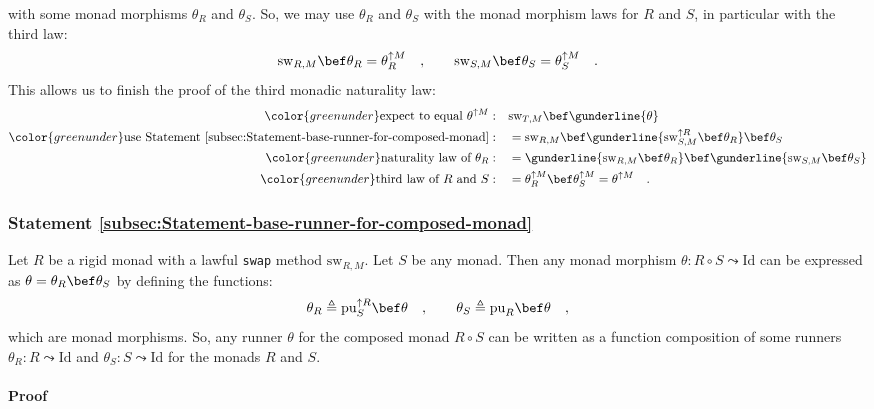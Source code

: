 with some monad morphisms $\theta_{R}$ and $\theta_{S}$. So, we
may use $\theta_{R}$ and $\theta_{S}$ with the monad morphism laws
for $R$ and $S$, in particular with the third law:
\[
\text{sw}_{R,M}\bef\theta_{R}=\theta_{R}^{\uparrow M}\quad,\quad\quad\text{sw}_{S,M}\bef\theta_{S}=\theta_{S}^{\uparrow M}\quad.
\]
This allows us to finish the proof of the third monadic naturality
law:
\begin{align*}
{\color{greenunder}\text{expect to equal }\theta^{\uparrow M}:}\quad & \text{sw}_{T,M}\bef\gunderline{\theta}\\
{\color{greenunder}\text{use Statement~\ref{subsec:Statement-base-runner-for-composed-monad}}:}\quad & =\text{sw}_{R,M}\bef\gunderline{\text{sw}_{S,M}^{\uparrow R}\bef\theta_{R}}\bef\theta_{S}\\
{\color{greenunder}\text{naturality law of }\theta_{R}:}\quad & =\gunderline{\text{sw}_{R,M}\bef\theta_{R}}\bef\gunderline{\text{sw}_{S,M}\bef\theta_{S}}\\
{\color{greenunder}\text{third law of }R\text{ and }S:}\quad & =\theta_{R}^{\uparrow M}\bef\theta_{S}^{\uparrow M}=\theta^{\uparrow M}\quad.
\end{align*}


\subsubsection{Statement \label{subsec:Statement-base-runner-for-composed-monad}\ref{subsec:Statement-base-runner-for-composed-monad}}

Let $R$ be a rigid monad with a lawful \lstinline!swap! method $\text{sw}_{R,M}$.
Let $S$ be any monad. Then any monad morphism $\theta:R\circ S\leadsto\text{Id}$
can be expressed as $\theta=\theta_{R}\bef\theta_{S}$ by defining
the functions:
\[
\theta_{R}\triangleq\text{pu}_{S}^{\uparrow R}\bef\theta\quad,\quad\quad\theta_{S}\triangleq\text{pu}_{R}\bef\theta\quad,
\]
which are monad morphisms. So, any runner $\theta$ for the composed
monad $R\circ S$ can be written as a function composition of some
runners $\theta_{R}:R\leadsto\text{Id}$ and $\theta_{S}:S\leadsto\text{Id}$
for the monads $R$ and $S$. 

\paragraph{Proof}

